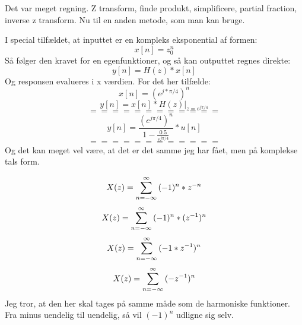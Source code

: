 \begin{Opgaver}
\begin{kapitel}[Z transformation]
\begin{Opgave}
\begin{UnderOpgave}[\text{$x[n] = e^{j*0.25*\pi * n}u[n]$}]
                Det var meget regning. 
                Z transform, finde produkt, simplificere, partial fraction, inverse z transform. 
                Nu til en anden metode, som man kan bruge.

                I special tilfældet, at inputtet er en kompleks eksponential af formen: 
                \[x[n] = z_0^n\]
                Så følger den kravet for en egenfunktioner, og så kan outputtet regnes direkte: 
                \[y[n] = H(z)*x[n]\]
                Og responsen evalueres i x værdien. 
                For det her tilfælde: 
                \[x[n] = (e^{j * \pi/4})^n\]
                \[y[n] = x[n]*H(z)|_{z=e^{j\pi/4}}\]
                \[============\]
                \[y[n] = \frac{(e^{j\pi/4})^n}{1 - \frac{0.5}{e^{j\pi/4}}} * u[n]\] 
                \[============\]
                Og det kan meget vel være, at det er det samme jeg har fået, men på komplekse tals form. 
            \end{UnderOpgave}
            
            \begin{UnderOpgave}[\text{$x[n] = (-1)^n,\tab{0} -\infty < n < \infty$}]
                \color{red}
                \[X(z) = \sum_{n = -\infty}^{\infty}{(-1)^n*z^{-n}}\]
                \[X(z) = \sum_{n = -\infty}^{\infty}{(-1)^n*(z^{-1})^n}\]
                \[X(z) = \sum_{n = -\infty}^{\infty}{(-1*z^{-1})^n}\]
                \[X(z) = \sum_{n = -\infty}^{\infty}{(-z^{-1})^n}\]
                Jeg tror, at den her skal tages på samme måde som de harmoniske funktioner. 
                Fra minus uendelig til uendelig, så vil $(-1)^n$ udligne sig selv.


\end{UnderOpgave}
\end{Opgave}
\end{kapitel}
\end{Opgaver}
